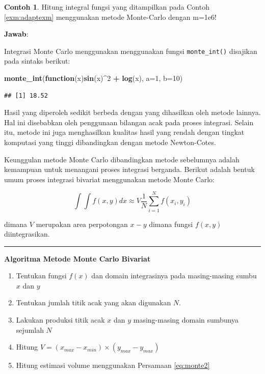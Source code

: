 \documentclass[
]{book}
\newenvironment{Shaded}{\begin{snugshade}}{\end{snugshade}}
\newcommand{\AttributeTok}[1]{\textcolor[rgb]{0.13,0.29,0.53}{#1}}
\newcommand{\ControlFlowTok}[1]{\textcolor[rgb]{0.13,0.29,0.53}{\textbf{#1}}}
\newcommand{\DecValTok}[1]{\textcolor[rgb]{0.00,0.00,0.81}{#1}}
\newcommand{\FunctionTok}[1]{\textcolor[rgb]{0.13,0.29,0.53}{\textbf{#1}}}
\newcommand{\NormalTok}[1]{#1}
\newcommand{\SpecialCharTok}[1]{\textcolor[rgb]{0.81,0.36,0.00}{\textbf{#1}}}
\providecommand{\tightlist}{%
  \setlength{\itemsep}{0pt}\setlength{\parskip}{0pt}}
\theoremstyle{definition}
\theoremstyle{definition}
\newtheorem{example}{Contoh}[chapter]
\theoremstyle{definition}
\theoremstyle{definition}
\theoremstyle{remark}
\begin{document}
\begin{example}
\protect\hypertarget{exm:monteexm}{}\label{exm:monteexm}Hitung integral fungsi yang ditampilkan pada Contoh \ref{exm:adaptexm} menggunakan metode Monte-Carlo dengan m=1e6!
\end{example}

\textbf{Jawab}:

Integrasi Monte Carlo menggunakan menggunakan fungsi \texttt{monte\_int()} disajikan pada sintaks berikut:

\begin{Shaded}
\begin{Highlighting}[]
\FunctionTok{monte\_int}\NormalTok{(}\ControlFlowTok{function}\NormalTok{(x)}\FunctionTok{sin}\NormalTok{(x)}\SpecialCharTok{\^{}}\DecValTok{2} \SpecialCharTok{+} \FunctionTok{log}\NormalTok{(x), }\AttributeTok{a=}\DecValTok{1}\NormalTok{, }\AttributeTok{b=}\DecValTok{10}\NormalTok{)}
\end{Highlighting}
\end{Shaded}

\begin{verbatim}
## [1] 18.52
\end{verbatim}

Hasil yang diperoleh sedikit berbeda dengan yang dihasilkan oleh metode lainnya. Hal ini disebabkan oleh penggunaan bilangan acak pada proses integrasi. Selain itu, metode ini juga menghasilkan kualitas hasil yang rendah dengan tingkat komputasi yang tinggi dibandingkan dengan metode Newton-Cotes.

Keunggulan metode Monte Carlo dibandingkan metode sebelumnya adalah kemampuan untuk menangani proses integrasi berganda. Berikut adalah bentuk umum proses integrasi bivariat menggunakan metode Monte Carlo:

\begin{equation}
\int \int f\left(x,y\right)dx\approx V\frac{1}{N}\sum_{i=1}^Nf\left(x_i,y_i\right)
  \label{eq:monte2}
\end{equation}

dimana \(V\) merupakan area perpotongan \(x-y\) dimana fungsi \(f\left(x,y\right)\) diintegrasikan.

\begin{center}\rule{0.5\linewidth}{0.5pt}\end{center}

\textbf{Algoritma Metode Monte Carlo Bivariat}

\begin{enumerate}
\def\labelenumi{\arabic{enumi}.}
\tightlist
\item
  Tentukan fungsi \(f\left(x\right)\) dan domain integrasinya pada masing-masing sumbu \(x\) dan \(y\)
\item
  Tentukan jumlah titik acak yang akan digunakan \(N\).
\item
  Lakukan produksi titik acak \(x\) dan \(y\) masing-masing domain sumbunya sejumlah \(N\)
\item
  Hitung \(V=\left( x_{max}-x_{min}\right) \times \left(y_{max}-y_{max}\right)\)
\item
  Hitung estimasi volume menggunakan Persamaan \eqref{eq:monte2}
\end{enumerate}
\end{document}
